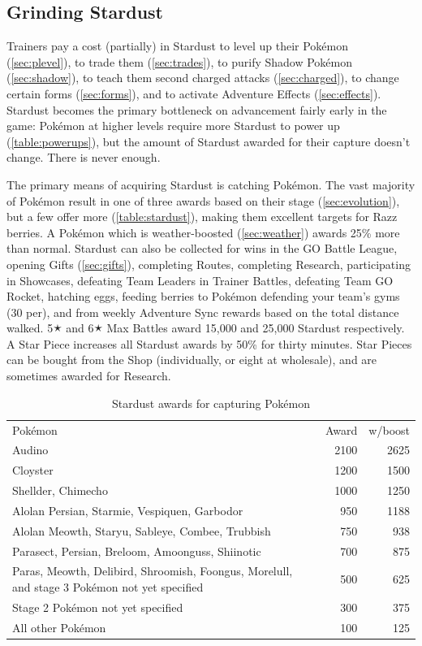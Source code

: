 \subsection{Grinding Stardust\label{subsec:getdust}}
Trainers pay a cost (partially) in Stardust
  to level up their Pokémon (\autoref{sec:plevel}),
  to trade them (\autoref{sec:trades}),
  to purify Shadow Pokémon (\autoref{sec:shadow}),
  to teach them second charged attacks (\autoref{sec:charged}),
  to change certain forms (\autoref{sec:forms}),
  and to activate Adventure Effects (\autoref{sec:effects}).
Stardust becomes the primary bottleneck on advancement fairly early in the game:
  Pokémon at higher levels require more Stardust to power up (\autoref{table:powerups}),
  but the amount of Stardust awarded for their capture doesn't change.
There is never enough.

The primary means of acquiring Stardust is catching Pokémon.
The vast majority of Pokémon result in one of three awards based on their stage
 (\autoref{sec:evolution}), but a few offer more (\autoref{table:stardust}),
 making them excellent targets for Razz berries.
A Pokémon which is weather-boosted (\autoref{sec:weather}) awards 25\% more than normal.
Stardust can also be collected for wins in the GO Battle League,
  opening Gifts (\autoref{sec:gifts}),
  completing Routes,
  completing Research,
  participating in Showcases,
  defeating Team Leaders in Trainer Battles,
  defeating Team GO Rocket,
  hatching eggs,
  feeding berries to Pokémon defending your team's gyms (30 per),
  and from weekly Adventure Sync rewards based on the total distance walked.
5🟉 and 6🟉 Max Battles award 15,000 and 25,000 Stardust respectively.
A Star Piece increases all Stardust awards by 50\% for thirty minutes.
Star Pieces can be bought from the Shop (individually, or eight at wholesale), and are sometimes awarded for Research.
\begin{table}
\centering
\begin{tabular}{p{}rr}
Pokémon & Award & w/boost\\
\Midrule
Audino & 2100 & 2625\\
Cloyster & 1200 & 1500\\
Shellder, Chimecho & 1000 & 1250\\
Alolan Persian, Starmie, Vespiquen, Garbodor & 950 & 1188\\
Alolan Meowth, Staryu, Sableye, Combee,\newline
\hspace{\parindent}Trubbish & 750 & 938\\
Parasect, Persian, Breloom, Amoonguss, Shiinotic & 700 & 875\\
Paras, Meowth, Delibird, Shroomish, Foongus,\newline
\hspace{\parindent}Morelull, and stage 3 Pokémon not yet specified & 500 & 625\\
Stage 2 Pokémon not yet specified & 300 & 375\\
All other Pokémon & 100 & 125\\
\end{tabular}
\caption{Stardust awards for capturing Pokémon\label{table:stardust}}
\end{table}
